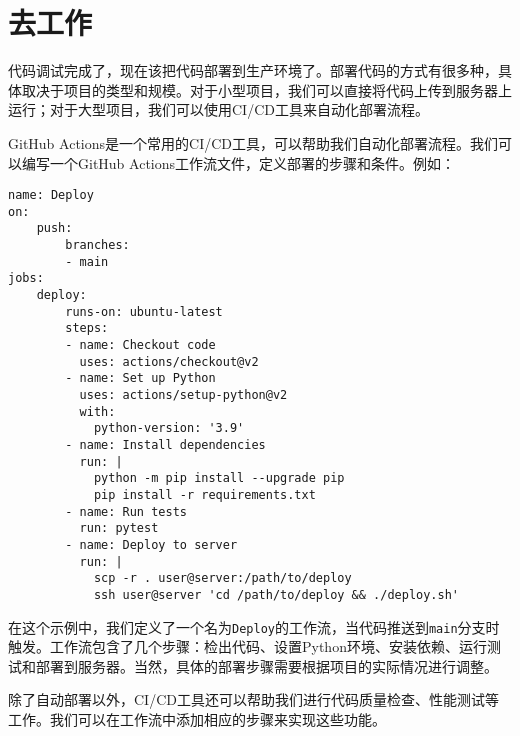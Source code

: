 \documentclass[../main.tex]{subfiles}
\begin{document}
\section{去工作}

代码调试完成了，现在该把代码部署到生产环境了。部署代码的方式有很多种，具体取决于项目的类型和规模。对于小型项目，我们可以直接将代码上传到服务器上运行；对于大型项目，我们可以使用CI/CD工具来自动化部署流程。

GitHub Actions是一个常用的CI/CD工具，可以帮助我们自动化部署流程。我们可以编写一个GitHub Actions工作流文件，定义部署的步骤和条件。例如：
\begin{lstlisting}
name: Deploy
on:
    push:
        branches:
        - main
jobs:
    deploy:
        runs-on: ubuntu-latest
        steps:
        - name: Checkout code
          uses: actions/checkout@v2
        - name: Set up Python
          uses: actions/setup-python@v2
          with:
            python-version: '3.9'
        - name: Install dependencies
          run: |
            python -m pip install --upgrade pip
            pip install -r requirements.txt
        - name: Run tests
          run: pytest
        - name: Deploy to server
          run: |
            scp -r . user@server:/path/to/deploy
            ssh user@server 'cd /path/to/deploy && ./deploy.sh'
\end{lstlisting}
在这个示例中，我们定义了一个名为\texttt{Deploy}的工作流，当代码推送到\texttt{main}分支时触发。工作流包含了几个步骤：检出代码、设置Python环境、安装依赖、运行测试和部署到服务器。当然，具体的部署步骤需要根据项目的实际情况进行调整。

除了自动部署以外，CI/CD工具还可以帮助我们进行代码质量检查、性能测试等工作。我们可以在工作流中添加相应的步骤来实现这些功能。
\end{document}
